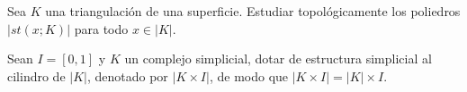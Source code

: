 \documentclass[twoside]{article}
\begin{document}
\begin{ejercicio}{1.11}
Sea $K$ una triangulación de una superficie.
Estudiar topológicamente los poliedros $|st(x;K)|$ para todo $x \in |K|$.
\end{ejercicio}
\begin{solucion}
\end{solucion}

\newpage

\begin{ejercicio}{1.12}
Sean $I = [0,1]$ y $K$ un complejo simplicial, dotar de estructura simplicial al cilindro de $|K|$, denotado por $|K \times I|$, de modo que $|K \times I| = |K| \times I$.
\end{ejercicio}
\begin{solucion}
\end{solucion}

\newpage
\end{document}
